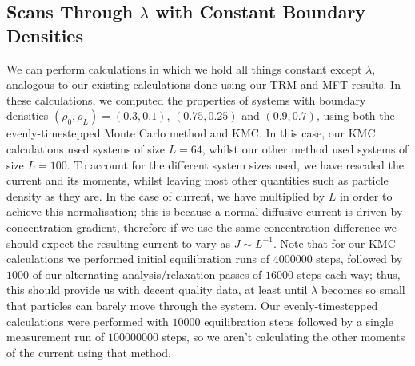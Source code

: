 \subsection{Scans Through $\lambda$ with Constant Boundary Densities} \label{sec:lambdaScans}
We can perform calculations in which we hold all things constant except $\lambda$, analogous to our 
existing calculations done using our TRM and MFT results. In these calculations, we computed the properties of systems with boundary densities $(\rho_0 , \rho_L )=(0.3, 0.1)$, $(0.75, 0.25)$ and 
$(0.9, 0.7)$, using both the evenly-timestepped Monte Carlo method and KMC. In this case, our KMC calculations used systems of size $L = 64$, whilst our other method used systems of size $L=100$.
To account for the different system sizes used, we have rescaled the current and its moments, whilst
leaving most other quantities such as particle density as they are. In the case of current, we have
multiplied by $L$ in order to achieve this normalisation; this is because a normal diffusive current is
driven by concentration gradient, therefore if we use the same concentration difference we should expect 
the resulting current to vary as $J \sim L^{-1}$. Note that for our KMC calculations we performed initial
equilibration runs of $4000000$ steps, followed by $1000$ of our alternating analysis/relaxation passes
of $16000$ steps each way; thus, this should provide us with decent quality data, at least until $\lambda$
becomes so small that particles can barely move through the system. Our evenly-timestepped calculations
were performed with $10000$ equilibration steps followed by a single measurement run of $100000000$ steps,
so we aren't calculating the other moments of the current using that method.

